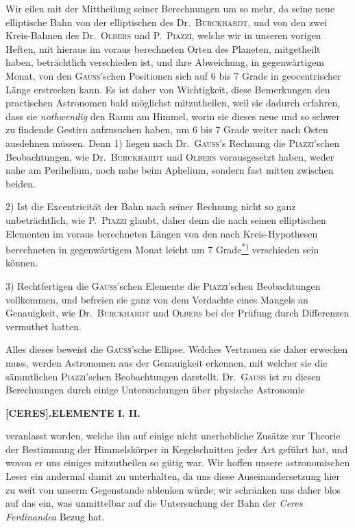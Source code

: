 Wir eilen mit der Mittheilung seiner Berechnungen um so mehr, da seine neue elliptische Bahn von der elliptischen des Dr.\ \textsc{Burckhardt}, und von den zwei Kreis-Bahnen des Dr.\ \textsc{Olbers} und P.\ \textsc{Piazzi}, welche wir in unseren vorigen Heften, mit hieraus im voraus berechneten Orten des Planeten, mitgetheilt haben, beträchtlich verschieden ist, und ihre Abweichung, in gegenwärtigem Monat, von den \textsc{Gauss}'schen Positionen sich auf 6 bis 7 Grade in geocentrischer Länge erstrecken kann. Es ist daher von Wichtigkeit, diese Bemerkungen den practischen Astronomen bald möglichst mitzutheilen, weil sie dadurch erfahren, dass sie \textit{nothwendig} den Raum am Himmel, worin sie dieses neue und so schwer zu findende Gestirn aufzusuchen haben, um 6 bis 7 Grade weiter nach Osten ausdehnen müssen. Denn 1) liegen nach Dr.\ \textsc{Gauss}'s Rechnung die \textsc{Piazzi}'schen Beobachtungen, wie Dr.\ \textsc{Burckhardt} und \textsc{Olbers} vorausgesetzt haben, weder nahe am Perihelium, noch nahe beim Aphelium, sondern fast mitten zwischen beiden.

2) Ist die Excentricität der Bahn nach seiner Rechnung nicht so ganz unbeträchtlich, wie P.\ \textsc{Piazzi} glaubt, daher denn die nach seinen elliptischen Elementen im voraus berechneten Längen von den nach Kreis-Hypothesen berechneten in gegenwärtigem Monat leicht um 7 Grade\hyperlink{native-204-note}{\textsuperscript{*)}} verschieden sein können.

3) Rechtfertigen die \textsc{Gauss}'schen Elemente die \textsc{Piazzi}'schen Beobachtungen vollkommen, und befreien sie ganz von dem Verdachte eines Mangels an Genauigkeit, wie Dr.\ \textsc{Burckhardt} und \textsc{Olbers} bei der Prüfung durch Differenzen vermuthet hatten.

Alles dieses beweist die \textsc{Gauss}'sche Ellipse. Welches Vertrauen sie daher erwecken muss, werden Astronomen aus der Genauigkeit erkennen, mit welcher sie die sämmtlichen \textsc{Piazzi}'schen Beobachtungen darstellt. Dr.\ \textsc{Gauss} ist zu diesen Berechnungen durch einige Untersuchungen über physische Astronomie
\par\clearpage
\thispagestyle{empty}
\normalsize
\noindent{}%
%
\parbox[t]{\dimexpr\linewidth-24mm\relax}{\centering\footnotesize\bfseries [CERES].\enspace ELEMENTE I. II.\par}%
\makebox[12mm][r]{}\par\nobreak\medskip
\noindent veranlasst worden, welche ihn auf einige nicht unerhebliche Zusätze zur Theorie der Bestimmung der Himmelskörper in Kegelschnitten jeder Art geführt hat, und wovon er uns einiges mitzutheilen so gütig war. Wir hoffen unsere astronomischen Leser ein andermal damit zu unterhalten, da uns diese Auseinandersetzung hier zu weit von unserm Gegenstande ablenken würde; wir schränken uns daher blos auf das ein, was unmittelbar auf die Untersuchung der Bahn der \textit{Ceres Ferdinandea} Bezug hat.

